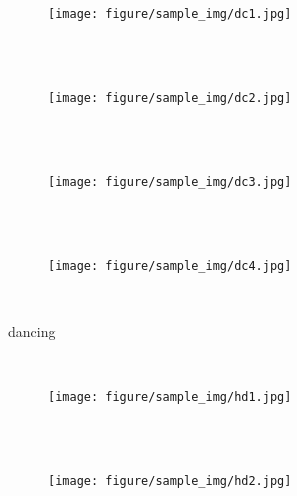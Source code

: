 \begin{figure*}[t]
  \centering
  \begin{subfigure}[b]{0.20\textwidth}
    \centering
    \begin{subfigure}[b]{0.23\textwidth}
      \centering
      \centerline{\texttt{[image: figure/sample\_img/dc1.jpg]}}
    \end{subfigure} \\
    ~\vspace{-3.0mm}\\
    \begin{subfigure}[b]{0.23\textwidth}
      \centering
      \centerline{\texttt{[image: figure/sample\_img/dc2.jpg]}}
    \end{subfigure} \\
    ~\vspace{-3.0mm}\\
    \begin{subfigure}[b]{0.23\textwidth}
      \centering
      \centerline{\texttt{[image: figure/sample\_img/dc3.jpg]}}
    \end{subfigure} \\
    ~\vspace{-3.0mm}\\
    \begin{subfigure}[b]{0.23\textwidth}
      \centering
      \centerline{\texttt{[image: figure/sample\_img/dc4.jpg]}}
    \end{subfigure} \\
    \caption{dancing}
  \end{subfigure}
  ~\hspace{-3mm}
  \begin{subfigure}[b]{0.20\textwidth}
    \centering
    \begin{subfigure}[b]{0.23\textwidth}
      \centering
      \centerline{\texttt{[image: figure/sample\_img/hd1.jpg]}}
    \end{subfigure} \\
    ~\vspace{-3.0mm}\\
    \begin{subfigure}[b]{0.23\textwidth}
      \centering
      \centerline{\texttt{[image: figure/sample\_img/hd2.jpg]}}
    \end{subfigure} \\
    ~\vspace{-3.0mm}\\

\end{subfigure}
\end{figure*}
